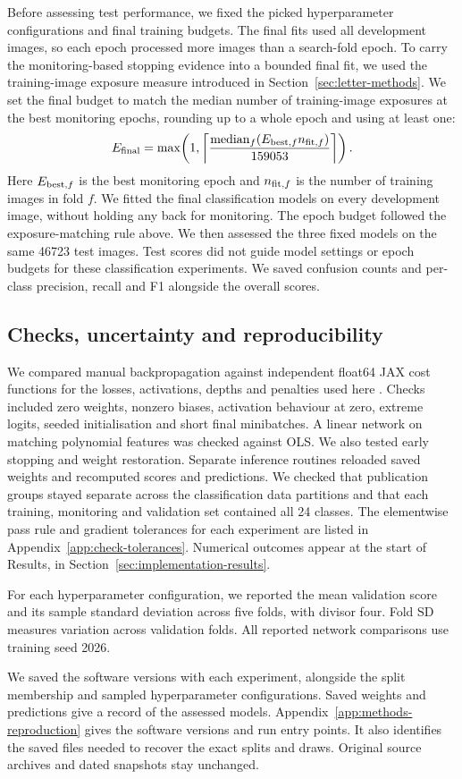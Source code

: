 Before assessing test performance, we fixed the picked hyperparameter configurations and final
training budgets. The final fits used all development images, so each
epoch processed more images than a search-fold epoch. To carry the
monitoring-based stopping evidence into a bounded final fit, we used the
training-image exposure measure introduced in
Section~\ref{sec:letter-methods}. We set the final
budget to match the median number of training-image exposures at the best
monitoring epochs, rounding up to a whole epoch and using at least one:
\[
E_{\rm final}=\max\!\left(1,
\left\lceil\frac{\operatorname{median}_{f}
(E_{{\rm best},f}n_{{\rm fit},f})}{159053}\right\rceil\right).
\]
Here $E_{{\rm best},f}$ is the best monitoring epoch and
$n_{{\rm fit},f}$ is the number of training images in fold $f$.
We fitted the final classification models on every development image,
without holding any back for monitoring. The epoch budget followed
the exposure-matching rule above.
We then assessed the three fixed models on the same 46723 test images.
Test scores did not guide model settings or epoch budgets for these
classification experiments.
We saved confusion counts and per-class precision, recall and F1 alongside
the overall scores. 

\subsection{Checks, uncertainty and reproducibility}
We compared manual backpropagation against independent float64 JAX
cost functions for the losses, activations, depths and penalties used here
\parencite{bradbury2018jax}. Checks included zero weights, nonzero biases,
activation behaviour at zero, extreme logits, seeded initialisation and
short final minibatches. A linear network on matching polynomial features
was checked against OLS. We also tested early stopping and weight
restoration. Separate inference routines reloaded saved weights and
recomputed scores and predictions. We checked that publication groups
stayed separate across the classification data partitions and that each
training, monitoring and validation set contained all 24 classes. The elementwise pass rule and gradient tolerances for each experiment are
listed in Appendix~\ref{app:check-tolerances}. Numerical outcomes appear
at the start of Results, in Section~\ref{sec:implementation-results}.

For each hyperparameter configuration, we reported the mean validation
score and its sample standard deviation across five folds, with divisor
four. Fold SD measures variation across validation folds. All reported
network comparisons use training seed 2026.

We saved the software versions with each experiment, alongside the
split membership and sampled hyperparameter configurations. Saved weights and predictions
give a record of the assessed models. Appendix~\ref{app:methods-reproduction}
gives the software versions and run entry points. It also identifies the
saved files needed to recover the exact splits and draws.
Original source archives and dated snapshots stay unchanged.

